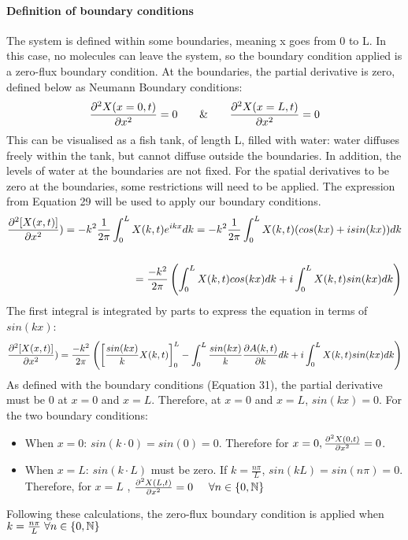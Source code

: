 \paragraph{Definition of boundary conditions}
The system is defined within some boundaries, meaning x goes from 0 to L. In this case, no molecules can leave the system, so the boundary condition applied is a zero-flux boundary condition. At the boundaries, the partial derivative is zero, defined below as Neumann Boundary conditions:
\begin{equation}
    \pdv[2]{X(x=0,t)}{x}=0  \hspace{0.5cm}\And  \hspace{0.5cm}\pdv[2]{X(x=L,t)}{x}=0
\end{equation}
This can be visualised as a fish tank, of length L, filled with water: water diffuses freely within the tank, but cannot diffuse outside the boundaries. In addition, the levels of water at the boundaries are not fixed. For the spatial derivatives to be zero at the boundaries, some restrictions will need to be applied. The expression from Equation 29 will be used to apply our boundary conditions.
\begin{equation}
    \begin{split}
        \pdv[2]{[X(x,t)]}{x}) =  -k^2 \frac{1}{2\pi}\int_{0}^{L} X(k,t)e^{ikx} dk =  -k^2 \frac{1}{2\pi}\int_{0}^{L} X(k,t)(cos(kx)+isin(kx))dk\\\\
        =\frac{-k^2}{2\pi}\left(\int_{0}^{L} X(k,t)cos(kx)dk + i\int_{0}^{L} X(k,t)sin(kx)dk\right)
    \end{split}
\end{equation}
The first integral is integrated by parts to express the equation in terms of $sin(kx)$:
\begin{equation}
    \begin{split}
        \pdv[2]{[X(x,t)]}{x}) = \frac{-k^2}{2\pi}\left(\left[\frac{sin(kx)}{k}X(k,t)\right]^L_{0} - \int_{0}^{L} \frac{sin(kx)}{k}\pdv{A(k,t)}{k}dk + i\int_{0}^{L} X(k,t)sin(kx)dk\right)
    \end{split}
\end{equation}
As defined with the boundary conditions (Equation 31), the partial derivative must be 0 at $x=0$ and  $x=L$. Therefore, at $x=0$ and  $x=L$, $sin(kx)=0$. For the two boundary conditions:
\begin{itemize}
    \item When $x=0$: $sin(k\cdot0)=sin(0)=0$. Therefore for $x=0,\pdv[2]{X(0,t)}{x}=0$.
    \item When $x=L$: $sin(k\cdot L)$ must be zero. If $ k=\frac{n\pi}{L}$, $sin(kL) = sin(n\pi) = 0$. Therefore, for $x=L$ , $\pdv[2]{X(L,t)}{x}=0 \hspace{0.5cm} \forall n \in \{0, \mathbb{N}\} $
\end{itemize}
Following these calculations, the zero-flux boundary condition is applied when $k=\frac{n\pi}{L} \hspace{0.1cm}\forall n \in \{0, \mathbb{N}\} $

